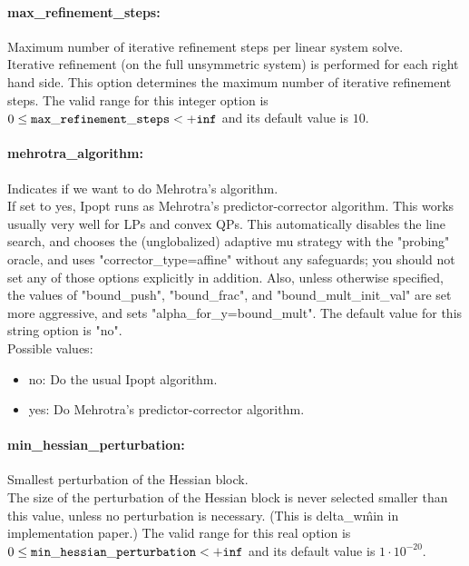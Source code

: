 \paragraph{max\_refinement\_steps:}\label{sec:max_refinement_steps} Maximum number of iterative refinement steps per linear system solve. $\;$ \\
 Iterative refinement (on the full unsymmetric
system) is performed for each right hand side. 
This option determines the maximum number of
iterative refinement steps. The valid range for this integer option is
$0 \le {\tt max\_refinement\_steps } <  {\tt +inf}$
and its default value is $10$.


\paragraph{mehrotra\_algorithm:}\label{sec:mehrotra_algorithm} Indicates if we want to do Mehrotra's algorithm. $\;$ \\
 If set to yes, Ipopt runs as Mehrotra's
predictor-corrector algorithm. This works usually
very well for LPs and convex QPs.  This
automatically disables the line search, and
chooses the (unglobalized) adaptive mu strategy
with the "probing" oracle, and uses
"corrector\_type=affine" without any safeguards;
you should not set any of those options
explicitly in addition.  Also, unless otherwise
specified, the values of "bound\_push",
"bound\_frac", and "bound\_mult\_init\_val" are
set more aggressive, and sets
"alpha\_for\_y=bound\_mult".
The default value for this string option is "no".
\\ 
Possible values:
\begin{itemize}
   \item no: Do the usual Ipopt algorithm.
   \item yes: Do Mehrotra's predictor-corrector algorithm.
\end{itemize}

\paragraph{min\_hessian\_perturbation:}\label{sec:min_hessian_perturbation} Smallest perturbation of the Hessian block. $\;$ \\
 The size of the perturbation of the Hessian block
is never selected smaller than this value, unless
no perturbation is necessary. (This is
delta\_w\^min in implementation paper.) The valid range for this real option is 
$0 \le {\tt min\_hessian\_perturbation } <  {\tt +inf}$
and its default value is $1 \cdot 10^{-20}$.


